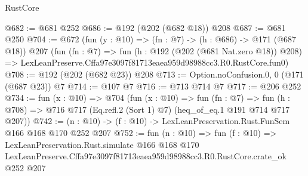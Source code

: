 \begin{lexlean}{RustCore}
\begin{coremodule}
@682 := @681 @252
@686 := @192 (@202 (@682 @18)) @208
@687 := @681 @250
@704 := @672
    (fun (y : @10) => (fn : @7) -> (h : @686) -> @171 (@687 @18))
    @207
    (fun (fn : @7) =>
    fun (h : @192 (@202 (@681 Nat.zero @18)) @208) =>
    LexLeanPreserve.Cffa97e3097f81713eaea959d98988cc3.R0.RustCore.fun0)
@708 := @192 (@202 (@682 @23)) @208
@713 := Option.noConfusion.{0, 0} (@171 (@687 @23)) @7
@714 := @107 @7
@716 := @713 @714 @7
@717 := @206 @252
@734 := fun (x : @10) =>
  @704
    (fun (x : @10) =>
    fun (fn : @7) =>
    fun (h : @708) => @716 @717 (Eq.refl.{2} (Sort 1) @7) (heq_of_eq.{1} @191 @714 @717 @207))
@742 := (n : @10) -> (f : @10) -> LexLeanPreservation.Rust.FunSem @166 @168 @170 @252 @207
@752 := fun (n : @10) =>
  fun (f : @10) =>
  LexLeanPreservation.Rust.simulate
    @166
    @168
    @170
    LexLeanPreserve.Cffa97e3097f81713eaea959d98988cc3.R0.RustCore.crate_ok
    @252
    @207
\end{coremodule}
\end{lexlean}
